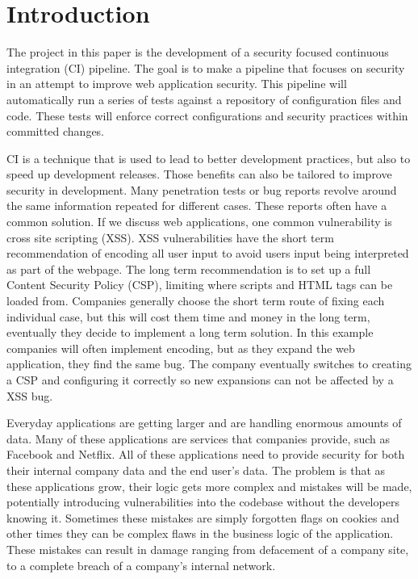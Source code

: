 \section{Introduction}
    The project in this paper is the development of a security focused continuous integration (CI) pipeline. The goal is to make a pipeline that focuses on security in an attempt to improve web
    application security. This pipeline will automatically run a series of tests against a repository of configuration files and code. These tests will enforce correct configurations and security
    practices within committed changes.

    CI is a technique that is used to lead to better development practices, but also to speed up development releases. Those benefits can also be tailored to improve security in 
    development. Many penetration tests or bug reports revolve around the same information repeated for different cases. These reports often have a common solution. If we discuss web applications, one 
    common vulnerability is cross site scripting (XSS). XSS vulnerabilities have the short term recommendation of encoding all user input to avoid users input being interpreted as part of the webpage. 
    The long term recommendation is to set up a full Content Security Policy (CSP), limiting where scripts and HTML tags can be loaded from. Companies generally choose the short term route of fixing 
    each individual case, but this will cost them time and money in the long term, eventually they decide to implement a long term solution. In this example companies will often implement encoding, 
    but as they expand the web application, they find the same bug. The company eventually switches to creating a CSP and configuring it correctly so new expansions can not be affected by a XSS bug.
    
    Everyday applications are getting larger and are handling enormous amounts of data. Many of these applications are services that companies provide, such as Facebook and Netflix. All of these 
    applications need to provide security for both their internal company data and the end user's data. The problem is that as these applications grow, their logic gets more complex and mistakes will 
    be made, potentially introducing vulnerabilities into the codebase without the developers knowing it. Sometimes these mistakes are simply forgotten flags on cookies and other times they can be 
    complex flaws in the business logic of the application. These mistakes can result in damage ranging from defacement of a company site, to a complete breach of a company's internal network.

